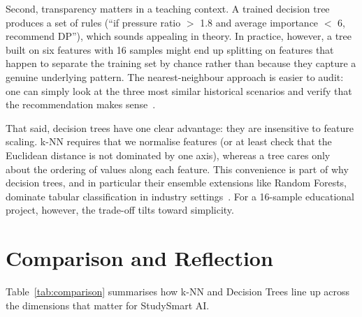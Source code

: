 \documentclass[12pt,a4paper]{article}
\begin{document}
Second, transparency matters in a teaching context.  A trained decision
tree produces a set of rules (``if pressure ratio \(>\) 1.8 and average
importance \(<\) 6, recommend DP''), which sounds appealing in theory.
In practice, however, a tree built on six features with 16 samples
might end up splitting on features that happen to separate the
training set by chance rather than because they capture a genuine
underlying pattern.  The nearest-neighbour approach is easier to audit:
one can simply look at the three most similar historical scenarios
and verify that the recommendation makes sense~\cite{aha1991instance}.

That said, decision trees have one clear advantage: they are
insensitive to feature scaling.  k-NN requires that we normalise
features (or at least check that the Euclidean distance is not
dominated by one axis), whereas a tree cares only about the ordering
of values along each feature.  This convenience is part of why
decision trees, and in particular their ensemble extensions like
Random Forests, dominate tabular classification in industry
settings~\cite{biau2016random}.  For a 16-sample educational project,
however, the trade-off tilts toward simplicity.


\section{Comparison and Reflection}

Table~\ref{tab:comparison} summarises how k-NN and Decision Trees
line up across the dimensions that matter for StudySmart AI.
\end{document}
